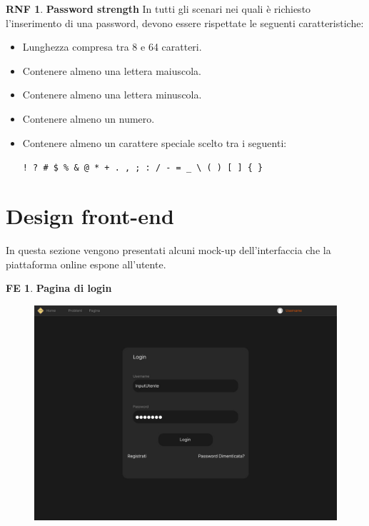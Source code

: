 \documentclass[11pt, a4paper]{article}
\theoremstyle{definition}
\newtheorem{nonfuncreq}{RNF} %
\newtheorem{frontend}{FE}
\begin{document}
\begin{nonfuncreq}
\label{legalpassword}
\textbf{Password strength }
In tutti gli scenari nei quali è richiesto l'inserimento di una password,
devono essere rispettate le seguenti caratteristiche:
\begin{itemize}
    \item Lunghezza compresa tra 8 e 64 caratteri.
    \item Contenere almeno una lettera maiuscola.
    \item Contenere almeno una lettera minuscola.
    \item Contenere almeno un numero.
    \item Contenere almeno un carattere speciale scelto tra i
    seguenti:
    \begin{center}
        \verb|! ? # $ % & @ * + . , ; : / - = _ \ ( ) [ ] { }|
    \end{center}
\end{itemize}
\end{nonfuncreq}




\newpage
\section{Design front-end}
In questa sezione vengono presentati alcuni mock-up dell'interfaccia che
la piattaforma online espone all'utente.

\begin{frontend}
\textbf{Pagina di login }
\end{frontend}
\begin{figure}[H]
\centering
\includegraphics[scale=0.22]{materiale/immaginife/login.jpeg}
\end{figure}
\end{document}
